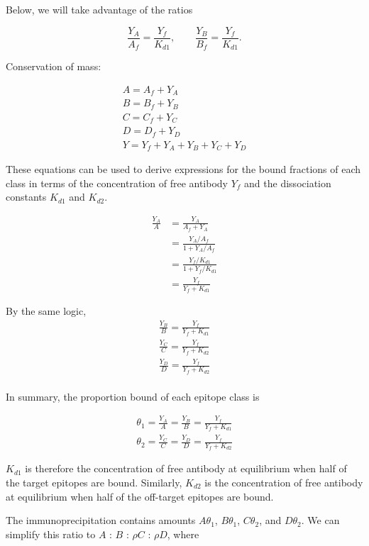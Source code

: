 \documentclass[11pt]{article}
\begin{document}
Below, we will take advantage of the ratios

$$
\frac{Y_A}{A_f}=\frac{Y_f}{K_{d1}},
\qquad
\frac{Y_B}{B_f}=\frac{Y_f}{K_{d1}}.
$$

Conservation of mass:

$$\begin{gathered}
A = A_f + Y_A \\
B = B_f + Y_B \\
C = C_f + Y_C \\
D = D_f + Y_D \\
Y = Y_f + Y_A + Y_B + Y_C + Y_D
\end{gathered}$$

These equations can be used to derive expressions for the bound fractions of each class in terms of the concentration of free antibody $Y_f$ and the dissociation constants $K_{d1}$ and $K_{d2}$.

$$\begin{aligned}
\frac{Y_A}{A}
&= \frac{Y_A}{A_f + Y_A} \\
&= \frac{Y_A / A_f}{1 + Y_A / A_f} \\
&= \frac{Y_f / K_{d1}}{1 + Y_f / K_{d1}} \\
&= \frac{Y_f}{Y_f+K_{d1}}
\end{aligned}$$

By the same logic,
$$\begin{gathered}
\frac{Y_B}{B} = \frac{Y_f}{Y_f + K_{d1}} \\
\frac{Y_C}{C} = \frac{Y_f}{Y_f + K_{d2}} \\
\frac{Y_D}{D} = \frac{Y_f}{Y_f + K_{d2}} \\
\end{gathered}$$

In summary, the proportion bound of each epitope class is

$$\begin{gathered}
\theta_1
= \frac{Y_A}{A}
= \frac{Y_B}{B}
= \frac{Y_f}{Y_f+K_{d1}} \\
\theta_2
= \frac{Y_C}{C}
= \frac{Y_D}{D}
= \frac{Y_f}{Y_f+K_{d2}}
\end{gathered}$$

$K_{d1}$ is therefore the concentration of free antibody at equilibrium when half of the target epitopes are bound. Similarly, $K_{d2}$ is the concentration of free antibody at equilibrium when half of the off-target epitopes are bound.

The immunoprecipitation contains amounts $A \theta_1$, $B \theta_1$, $C \theta_2$, and $D \theta_2$. We can simplify this ratio to $A$ : $B$ : $\rho C$ : $\rho D$, where
\end{document}
